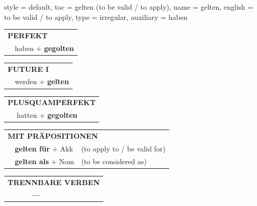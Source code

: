 \begin{verbentry}{
  style = {default},
  toc = {gelten (to be valid / to apply)},
  name = {gelten},
  english = {to be valid / to apply},
  type = {irregular},
  auxiliary = {haben}
}
 \begin{tabular}{rl}
     \multicolumn{2}{l}{\textbf{PERFEKT}}\\
   & haben + \textbf{gegolten}\\
  \end{tabular}
\hfill
   \begin{tabular}{rl}
    \multicolumn{2}{l}{\textbf{FUTURE I} }\\
   & werden + \textbf{gelten}\\
  \end{tabular}
\hfill
   \begin{tabular}{rl}
      \multicolumn{2}{l}{\textbf{PLUSQUAMPERFEKT}}\\
   & hatten + \textbf{gegolten}\\
  \end{tabular}

   \vspace{10pt}

   \begin{tabular}{lll}
      \multicolumn{3}{l}{\textbf{MIT PRÄPOSITIONEN}}\\
& \textbf{gelten für} + Akk & (to apply to / be valid for)\\
& \textbf{gelten als} + Nom & (to be considered as)\\
\end{tabular}
  \hfill
   \begin{tabular}{lll}
\multicolumn{3}{l}{\textbf{TRENNBARE VERBEN}}\\
& \textbf{---} & \\
\end{tabular}

  \vspace{-5pt}
\end{verbentry}

